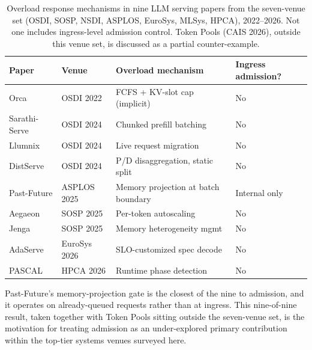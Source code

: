 \documentclass[11pt,letterpaper]{article}
\theoremstyle{definition}
\begin{document}
\begin{table}[htbp]
\centering
\caption{Overload response mechanisms in nine LLM serving papers from the seven-venue set (OSDI, SOSP, NSDI, ASPLOS, EuroSys, MLSys, HPCA), 2022--2026. Not one includes ingress-level admission control. Token Pools (CAIS 2026), outside this venue set, is discussed as a partial counter-example.}
\label{tab:9for9}
\small
{}
\begin{tabular}{l l l l}
\toprule
\rowcolor{admitteallight}
\textbf{Paper} & \textbf{Venue} & \textbf{Overload mechanism} & \textbf{Ingress admission?} \\
\midrule
Orca & OSDI 2022 & FCFS + KV-slot cap (implicit) & No \\
Sarathi-Serve & OSDI 2024 & Chunked prefill batching & No \\
Llumnix & OSDI 2024 & Live request migration & No \\
DistServe & OSDI 2024 & P/D disaggregation, static split & No \\
Past-Future & ASPLOS 2025 & Memory projection at batch boundary & Internal only \\
Aegaeon & SOSP 2025 & Per-token autoscaling & No \\
Jenga & SOSP 2025 & Memory heterogeneity mgmt & No \\
AdaServe & EuroSys 2026 & SLO-customized spec decode & No \\
PASCAL & HPCA 2026 & Runtime phase detection & No \\
\bottomrule
\end{tabular}
\end{table}

Past-Future's memory-projection gate is the closest of the nine to
admission, and it operates on already-queued requests rather than at
ingress. This nine-of-nine result, taken together with Token Pools
sitting outside the seven-venue set, is the motivation for treating
admission as an under-explored primary contribution within the
top-tier systems venues surveyed here.
\end{document}
